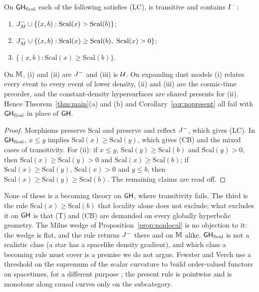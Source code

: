 \begin{proposition}\label{prop:clock}
On $\mathsf{GH}_{\mathrm{Scal}}$ each of the following satisfies (LC), is transitive and contains
$I^{-}$:
\begin{enumerate}
\item[(i)] $J^{-}_M\cup\{(x,b):\mathrm{Scal}(x)>\mathrm{Scal}(b)\}$;
\item[(ii)] $J^{-}_M\cup\{(x,b):\mathrm{Scal}(x)\ge \mathrm{Scal}(b),\ \mathrm{Scal}(x)>0\}$;
\item[(iii)] $\{(x,b):\mathrm{Scal}(x)\ge \mathrm{Scal}(b)\}$.
\end{enumerate}
On $\mathbb M$, (i) and (ii) are $J^{-}$ and (iii) is $\mathcal U$. On expanding dust models
(i) relates every event to every event of lower density, (ii) and (iii) are
the cosmic-time preorder, and the constant-density hypersurfaces are shared
presents for (ii). Hence Theorem~\ref{thm:main}(a) and (b) and
Corollary~\ref{cor:nopresent} all fail with $\mathsf{GH}_{\mathrm{Scal}}$ in place of $\mathsf{GH}$.
\end{proposition}

\begin{proof}
Morphisms preserve $\mathrm{Scal}$ and preserve and reflect $J^{-}$, which gives (LC). In
$\mathsf{GH}_{\mathrm{Scal}}$, $x\le y$ implies $\mathrm{Scal}(x)\ge \mathrm{Scal}(y)$, which gives (CB) and the mixed cases
of transitivity. For (ii): if $x\le y$, $\mathrm{Scal}(y)\ge \mathrm{Scal}(b)$ and $\mathrm{Scal}(y)>0$, then
$\mathrm{Scal}(x)\ge \mathrm{Scal}(y)>0$ and $\mathrm{Scal}(x)\ge \mathrm{Scal}(b)$; if $\mathrm{Scal}(x)\ge \mathrm{Scal}(y)$, $\mathrm{Scal}(x)>0$ and $y\le b$,
then $\mathrm{Scal}(x)\ge \mathrm{Scal}(y)\ge \mathrm{Scal}(b)$. The remaining claims are read off.
\end{proof}

None of these is a becoming theory on $\mathsf{GH}$, where transitivity fails. The
third is the rule $\mathrm{Scal}(x)\ge \mathrm{Scal}(b)$ that locality alone does not exclude; what
excludes it on $\mathsf{GH}$ is that (T) and (CB) are demanded on every globally
hyperbolic geometry. The Milne wedge of Proposition~\ref{prop:nonlocal} is no
objection to it: the wedge is flat, and the rule returns $J^{-}$ there and on
$\mathbb M$ alike. $\mathsf{GH}_{\mathrm{Scal}}$ is not a realistic class (a star has a spacelike
density gradient), and which class a becoming rule must cover is a premise we
do not argue. Fewster and Verch use a threshold on the supremum of the scalar
curvature to build order-valued functors on spacetimes, for a different purpose
\citep[\S4.3]{FV2012}; the present rule is pointwise and is monotone along causal
curves only on the subcategory.

